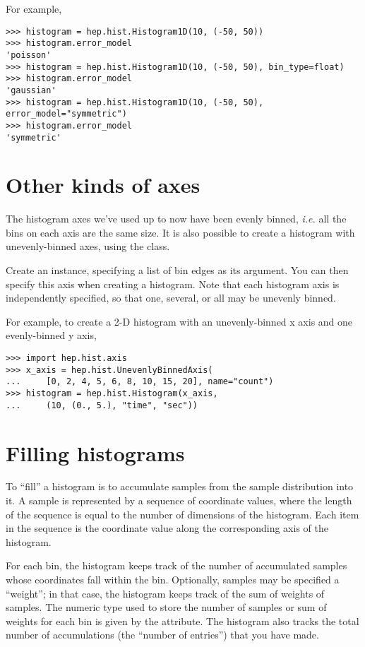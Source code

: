 For example,
\begin{verbatim}
>>> histogram = hep.hist.Histogram1D(10, (-50, 50))
>>> histogram.error_model
'poisson'
>>> histogram = hep.hist.Histogram1D(10, (-50, 50), bin_type=float)
>>> histogram.error_model
'gaussian'
>>> histogram = hep.hist.Histogram1D(10, (-50, 50), error_model="symmetric")
>>> histogram.error_model
'symmetric'
\end{verbatim}


\section{Other kinds of axes}

The histogram axes we've used up to now have been evenly binned,
\textit{i.e.} all the bins on each axis are the same size.  It is also
possible to create a histogram with unevenly-binned axes, using the
 class.  

Create an  instance, specifying a list of bin
edges as its argument.  You can then specify this axis when creating a
histogram.  Note that each histogram axis is independently specified, so
that one, several, or all may be unevenly binned.

For example, to create a 2-D histogram with an unevenly-binned x axis
and one evenly-binned y axis,
\begin{verbatim}
>>> import hep.hist.axis
>>> x_axis = hep.hist.UnevenlyBinnedAxis(
...     [0, 2, 4, 5, 6, 8, 10, 15, 20], name="count")
>>> histogram = hep.hist.Histogram(x_axis, 
...     (10, (0., 5.), "time", "sec"))
\end{verbatim}


\section{Filling histograms}

To ``fill'' a histogram is to accumulate samples from the sample
distribution into it.  A sample is represented by a sequence of
coordinate values, where the length of the sequence is equal to the
number of dimensions of the histogram.   Each item in the sequence is
the coordinate value along the corresponding axis of the histogram.

For each bin, the histogram keeps track of the number of accumulated
samples whose coordinates fall within the bin.  Optionally, samples may
be specified a ``weight''; in that case, the histogram keeps track of
the sum of weights of samples.  The numeric type used to store the
number of samples or sum of weights for each bin is given by the
 attribute.  The histogram also tracks the total
number of accumulations (the ``number of entries'') that you have made.

